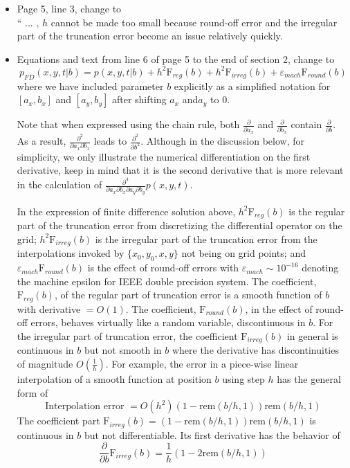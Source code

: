 \documentclass[12pt]{article}
\begin{document}
\begin{itemize}
\item Page 5, line 3, change to \\
`` ... , $h$ cannot be made too small because round-off error and the irregular part of 
the truncation error become an issue relatively quickly. 

\item Equations and text from line 6 of page 5 to the end of section 2, change to \\
$$p_{FD}(\left. x, y, t \right| b) = p(\left. x, y, t \right| b) 
+ h^2 \mbox{F}_{reg}(b) + h^2 \mbox{F}_{irreg}(b) + 
\varepsilon_{mach} \mbox{F}_{round}(b) $$
where we have included parameter $b $ explicitly as a simplified notation for 
$[a_x, b_x]$ and $[a_y, b_y]$ after shifting $a_x$ and$a_y$ to 0. 

Note that when expressed using the chain rule, both 
$\displaystyle \frac{\partial}{\partial a_x}$ and  $\displaystyle \frac{\partial}{\partial b_x}$
contain $\displaystyle \frac{\partial}{\partial b}$. As a result, 
$\displaystyle \frac{\partial^2 }{\partial a_x \partial b_x} $ leads to 
$\displaystyle \frac{\partial^2 }{\partial b^2} $. Although in the discussion below, 
for simplicity, we only illustrate the numerical differentiation on the first derivative, 
keep in mind that it is the second derivative that is more relevant in the calculation of 
 $\displaystyle \frac{\partial^4}{\partial a_x \partial b_x \partial a_y \partial b_y}
p(x, y, t) $. 

In the expression of finite difference solution above, 
$h^2 \mbox{F}_{reg}(b) $ is the regular part of 
the truncation error from discretizing the differential operator on the grid; 
$h^2 \mbox{F}_{irreg}(b) $ is the irregular part of the truncation error 
from the interpolations invoked by $\{x_0, y_0, x, y \}$ not being on grid points; 
and $\varepsilon_{mach} \mbox{F}_{round}(b) $ is the effect of round-off errors
with $\varepsilon_{mach} \sim 10^{-16}$ denoting the machine epsilon for 
IEEE double precision system. 
The coefficient, $\mbox{F}_{reg}(b) $, of the regular part of truncation error 
is a smooth function of $b$ with derivative $= O(1)$. 
The coefficient, $\mbox{F}_{round}(b) $, in the effect of round-off errors, 
behaves virtually like a random variable, discontinuous in $b$. 
For the irregular part of truncation error, the coefficient $\mbox{F}_{irreg}(b) $ 
in general is continuous in $b$ but not smooth in $b$ where the derivative has 
discontinuities of magnitude $O\left( \frac{1}{h} \right)$. 
For example, the error in 
a piece-wise linear interpolation of a smooth function at position $b$ using step $h$ 
has the general form of 
$$\mbox{Interpolation error } = O(h^2) (1-\mbox{rem}(b/h,1)) \mbox{rem}(b/h,1)$$ 
The coefficient part $\mbox{F}_{irreg}(b) = (1-\mbox{rem}(b/h,1)) \mbox{rem}(b/h,1) $ 
is continuous in $b$ but not differentiable. Its first derivative 
has the behavior of 
$$ \frac{\partial }{\partial b} \mbox{F}_{irreg}(b) =  \frac{1}{h} \left(1-2\mbox{rem}(b/h,1) \right)$$


\end{itemize}
\end{document}
